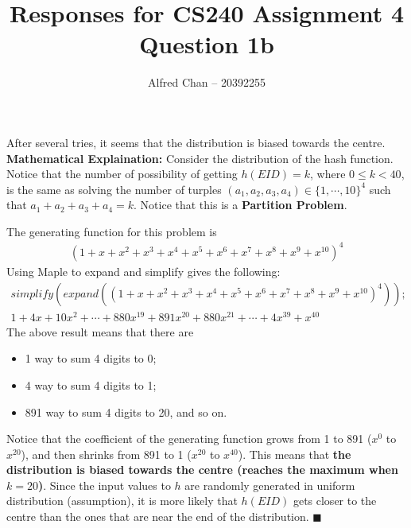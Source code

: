 \documentclass[12pt]{article}
\title{Responses for CS240 Assignment 4 Question 1b}
\author{Alfred Chan -- 20392255}
\begin{document}
\maketitle
After several tries, it seems that the distribution is biased towards the centre.\\

{\bf Mathematical Explaination:} Consider the distribution of the hash function.
Notice that the number of possibility of getting $h(EID) = k$,
where $0 \le k < 40$, is the same as solving the number of turples 
	$(a_1,a_2,a_3,a_4) \in \{1, \cdots, 10\}^4$ such that $a_1 + a_2 + a_3 + a_4 = k$.
Notice that this is a {\bf Partition Problem}.

The generating function for this problem is
\begin{align}
(1+x+x^2+x^3+x^4+x^5+x^6+x^7+x^8+x^9+x^{10})^4
\end{align}
Using Maple to expand and simplify gives the following:
\begin{gather*}
simplify(expand((1+x+x^2+x^3+x^4+x^5+x^6+x^7+x^8+x^9+x^10)^4));\\
1+4x+10x^2+ \cdots
	+ 880x^{19} + 891x^{20} + 880x^{21} + \cdots
	+ 4x^{39} + x^{40}
\end{gather*}
The above result means that there are
\begin{itemize}
\item 1 way to sum 4 digits to 0;
\item 4 way to sum 4 digits to 1;
\item 891 way to sum 4 digits to 20, and so on.
\end{itemize}

Notice that the coefficient of the generating function
	grows from 1 to 891 ($x^{0}$ to $x^{20}$),
	and then shrinks from 891 to 1 ($x^{20}$ to $x^{40}$).
This means that {\bf the distribution is biased towards the centre (reaches the maximum when $k=20$)}.
Since the input values to $h$ are randomly generated in uniform distribution (assumption),
it is more likely that $h(EID)$ gets closer to the centre than the ones that are near the end of the distribution.
\hfill $\blacksquare$
\end{document}
